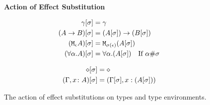 \begin{figure}[H]
    
    \begin{framed}
        \centering
        \textbf{Action of Effect Substitution}

        \begin{minipage}{.47\linewidth}
            
\begin{align*}
    \gamma[\sigma] &= \gamma \\
    (A\rightarrow B)[\sigma] &= (A[\sigma])\rightarrow (B[\sigma]) \\
    (\texttt{M}_{\epsilon}{A})[\sigma] &= \texttt{M}_{\sigma(\epsilon)}{(A[\sigma])}\\
    (\forall \alpha. A)[\sigma] &= \forall \alpha. (A[\sigma])\quad\text{If $\alpha\#\sigma$}
\end{align*}
        \end{minipage}
        \quad
        \begin{minipage}{.47\linewidth}
            \begin{align*}
                \diamond[\sigma] & = \diamond \\
                (\Gamma, x\colon A)[\sigma] &= (\Gamma[\sigma], x:(A[\sigma]))\\
            \end{align*}            
        \end{minipage}
    \end{framed}
    
    \caption{The action of effect substitutions on types and type environments.}
    \label{SubstitutionActionTypesTypeEnvs}
\end{figure}




